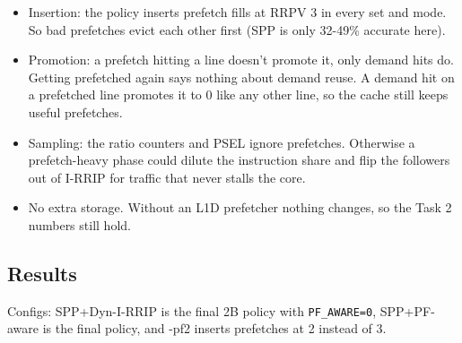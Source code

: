 \documentclass[10pt]{article}
\providecommand{\tightlist}{%
  \setlength{\itemsep}{2pt}\setlength{\parskip}{0pt}}
\begin{document}
\begin{itemize}
\tightlist
\item Insertion: the policy inserts prefetch fills at RRPV 3 in every set and mode. So bad prefetches evict each other first (SPP is only 32-49\% accurate here).
\item Promotion: a prefetch hitting a line doesn't promote it, only demand hits do. Getting prefetched again says nothing about demand reuse. A demand hit on a prefetched line promotes it to 0 like any other line, so the cache still keeps useful prefetches.
\item Sampling: the ratio counters and PSEL ignore prefetches. Otherwise a prefetch-heavy phase could dilute the instruction share and flip the followers out of I-RRIP for traffic that never stalls the core.
\item No extra storage. Without an L1D prefetcher nothing changes, so the Task 2 numbers still hold.
\end{itemize}

\subsection{Results}

Configs: SPP+Dyn-I-RRIP is the final 2B policy with \texttt{PF\_AWARE=0}, SPP+PF-aware is the final policy, and -pf2 inserts prefetches at 2 instead of 3.
\end{document}
